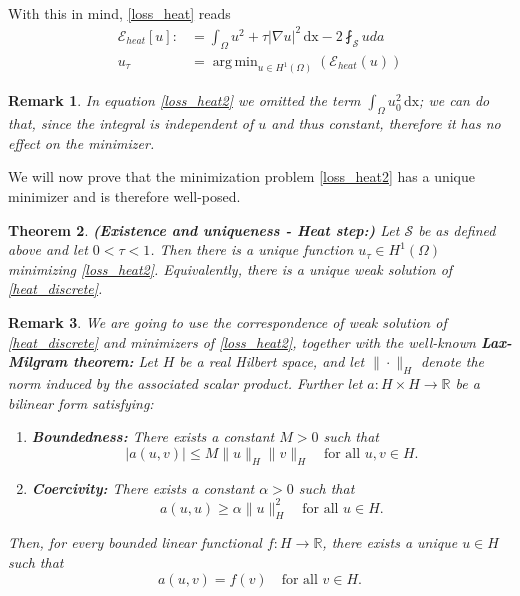 \documentclass[12pt,openany]{book}
\newcommand{\R}{\mathbb{R}}
\theoremstyle{plainnormal}
\newtheorem{theorem}{Theorem}[section]
\newtheorem{remark}[theorem]{Remark}
\theoremstyle{remark}
\DeclareMathOperator*{\argmin}{arg\,min}
\begin{document}
\\
With this in mind, \cref{loss_heat} reads
\begin{align}\label{loss_heat2}
    \mathcal{E}_{heat}[u] :&= \int_\Omega u^2 + \tau |\nabla u|^2 \,\mathrm{dx} - 2\fint_\mathcal{S} u da\\
    u_\tau &= \argmin_{u\in H^1(\Omega)} (\mathcal{E}_{heat}(u))
\end{align}
\begin{remark}
    In equation \eqref{loss_heat2} we omitted the term $\int_\Omega u_0 ^2 \,\mathrm{dx}$; we can do that, since the integral is independent of $u$ and thus constant, therefore it has no effect on the minimizer. 
\end{remark}
We will now prove that the minimization problem \cref{loss_heat2} has a unique minimizer and is therefore well-posed.
\begin{theorem}\label{thm_exUniq_heat}{\textbf{(Existence and uniqueness - Heat step:)}}
Let $\mathcal{S}$ be as defined above and let $0 < \tau < 1$. Then there is a unique function $u_\tau \in H^1(\Omega)$ minimizing \cref{loss_heat2}. Equivalently, there is a unique weak solution of \eqref{heat_discrete}.
\end{theorem}
\begin{remark}
We are going to use the correspondence of weak solution of \cref{heat_discrete} and minimizers of \cref{loss_heat2}, together with the well-known \textbf{Lax-Milgram theorem:} Let \( H \) be a real Hilbert space, and let $\|\cdot\|_H$ denote the norm induced by the associated scalar product. Further let \( a : H \times H \to \mathbb{R} \) be a bilinear form satisfying:
\begin{enumerate}
  \item \textbf{Boundedness:} There exists a constant \( M > 0 \) such that
  \[
  |a(u, v)| \leq M \|u\|_H \|v\|_H \quad \text{for all } u, v \in H.
  \]
  
  \item \textbf{Coercivity:} There exists a constant \( \alpha > 0 \) such that
  \[
  a(u, u) \geq \alpha \|u\|_H^2 \quad \text{for all } u \in H.
  \]
\end{enumerate}
Then, for every bounded linear functional \( f : H \rightarrow\R \), there exists a unique \( u \in H \) such that
\[
a(u, v) = f(v) \quad \text{for all } v \in H.
\]
\end{remark}
\end{document}
